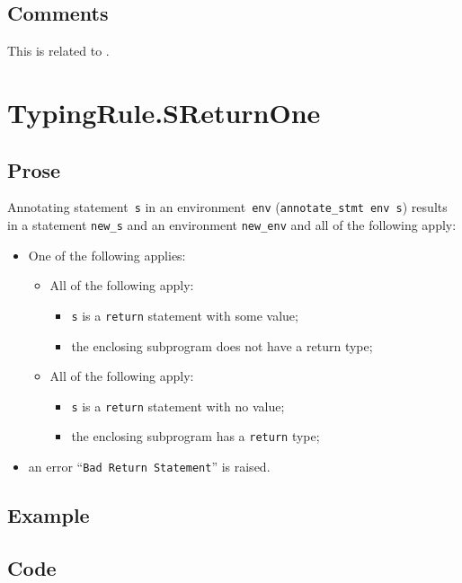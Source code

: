 \documentclass{book}
\begin{document}
\subsection{Comments}
    This is related to .


\section{TypingRule.SReturnOne \label{sec:TypingRule.SReturnOne}}

  \subsection{Prose}
Annotating statement~\texttt{s} in an environment~\texttt{env}
(\texttt{annotate\_stmt env s}) results in a statement \texttt{new\_s} and an
environment \texttt{new\_env} and all of the following apply:
   \begin{itemize}
   \item One of the following applies:
     \begin{itemize}
     \item All of the following apply:
       \begin{itemize}
       \item \texttt{s} is a \texttt{return} statement with some value;
       \item the enclosing subprogram does not have a return type;
       \end{itemize}
     \item All of the following apply:
       \begin{itemize}
       \item \texttt{s} is a \texttt{return} statement with no value;
       \item the enclosing subprogram has a \texttt{return} type;
       \end{itemize}
     \end{itemize}
   \item an error ``\texttt{Bad Return Statement}'' is raised.
   \end{itemize}

  \subsection{Example}

  \subsection{Code}
\end{document}
